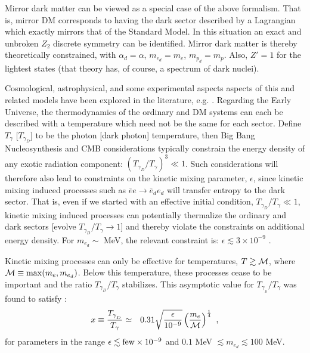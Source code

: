 \documentclass[12pt]{article}
\begin{document}
Mirror dark matter can be viewed as a special case of the above formalism. That is, mirror DM corresponds to having 
the dark  sector described by a Lagrangian which exactly mirrors that of the Standard Model. In this situation an exact 
and unbroken $Z_2$ discrete symmetry can be identified. Mirror dark matter is thereby theoretically constrained, 
with $\alpha_d = \alpha$, $m_{e_d} = m_e$, $m_{p_d} = m_p$. Also, $Z' = 1$ for the lightest states (that theory has, of course, a spectrum of dark nuclei).

Cosmological, astrophysical, and some experimental aspects aspects of this and related models have been explored in 
the literature, 
e.g. \cite{cg,rich1,H1,ber1,ignatiev, ber2, cmb2,rich2,rich4,rich2x,rich1x,rich5,cyr2,rich6,foot9,fischler1,cyn,sigurdson4,rich7,petraki2,m1,vogel1,
rich8,raidal,reece,footdiurnal,diurnal,jackson,trodden}. Regarding the  
Early Universe, the thermodynamics of the ordinary and DM systems can each be described  with a temperature which 
need not be the same for each sector. Define $T_\gamma$ [$T_{\gamma_D}$] to be the photon [dark photon] temperature, then Big Bang Nucleosynthesis 
and CMB considerations typically constrain the energy density of any exotic radiation component: $(T_{\gamma_D}/T_\gamma)^3 \ll 1$. 
Such considerations will therefore also lead to constraints on the kinetic mixing parameter, $\epsilon$, since kinetic mixing induced processes 
such as $\bar e e \to \bar e_d e_d$ will transfer entropy to the dark sector. That is, even if we started with an effective 
initial condition, $T_{\gamma_D}/T_\gamma \ll 1$, kinetic mixing induced processes can potentially thermalize the ordinary and dark 
sectors [evolve $T_{\gamma_D}/T_\gamma \to 1$] and thereby violate the constraints on additional energy 
density. For $m_{e_d} \sim$ MeV, the relevant constraint is:  $\epsilon \lesssim 3 \times 10^{-9}$ \cite{foot9,rich8,vogel1}.

Kinetic mixing processes can only be effective for temperatures, $T \gtrsim {\cal M}$, where ${\cal M } \equiv \max(m_e, m_{e_d})$. 
Below this temperature, these processes cease to be important and the ratio $T_{\gamma_D}/T_{\gamma}$ stabilizes. This 
asymptotic value for $T _{\gamma _{_D}}/T _{\gamma}$ was found to satisfy \cite{rich8}:
%
\begin{eqnarray}
x \equiv \frac{T _{\gamma _{_D}}}{T _{\gamma}} & \simeq & 0.31 \sqrt{\frac{\epsilon}{10^{-9}}} \left (\frac{m _e}{{\cal M}} \right )^{\frac{1}{4}} \ , 
\label{masterformula}
\end{eqnarray}
%
for parameters in the range $\epsilon \lesssim {\rm few} \times 10 ^{-9}$ and $0.1$ MeV $\lesssim m _{e_d} \lesssim 100$ MeV.
\end{document}
